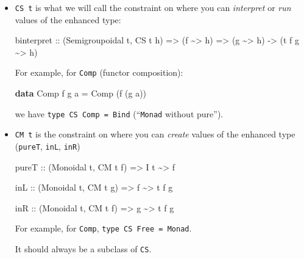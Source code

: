 \documentclass[]{article}
\newenvironment{Shaded}{}{}
\newcommand{\DataTypeTok}[1]{\textcolor[rgb]{0.56,0.13,0.00}{#1}}
\newcommand{\KeywordTok}[1]{\textcolor[rgb]{0.00,0.44,0.13}{\textbf{#1}}}
\newcommand{\NormalTok}[1]{#1}
\newcommand{\OperatorTok}[1]{\textcolor[rgb]{0.40,0.40,0.40}{#1}}
\newcommand{\OtherTok}[1]{\textcolor[rgb]{0.00,0.44,0.13}{#1}}
\begin{document}
\begin{itemize}
\item
  \texttt{CS\ t} is what we will call the constraint on where you can
  \emph{interpret} or \emph{run} values of the enhanced type:

\begin{Shaded}
\begin{Highlighting}[]
\NormalTok{binterpret}
\OtherTok{    ::}\NormalTok{ (}\DataTypeTok{Semigroupoidal}\NormalTok{ t, }\DataTypeTok{CS}\NormalTok{ t h)}
    \OtherTok{=>}\NormalTok{ (f }\OperatorTok{\textasciitilde{}>}\NormalTok{ h)}
    \OtherTok{=>}\NormalTok{ (g }\OperatorTok{\textasciitilde{}>}\NormalTok{ h)}
    \OtherTok{{-}>}\NormalTok{ (t f g }\OperatorTok{\textasciitilde{}>}\NormalTok{ h)}
\end{Highlighting}
\end{Shaded}

  For example, for \texttt{Comp} (functor composition):

\begin{Shaded}
\begin{Highlighting}[]
\KeywordTok{data} \DataTypeTok{Comp}\NormalTok{ f g a }\OtherTok{=} \DataTypeTok{Comp}\NormalTok{ (f (g a))}
\end{Highlighting}
\end{Shaded}

  we have \texttt{type\ CS\ Comp\ =\ Bind} (``\texttt{Monad} without pure'').
\item
  \texttt{CM\ t} is the constraint on where you can \emph{create} values of the
  enhanced type (\texttt{pureT}, \texttt{inL}, \texttt{inR})

\begin{Shaded}
\begin{Highlighting}[]
\NormalTok{pureT}
\OtherTok{    ::}\NormalTok{ (}\DataTypeTok{Monoidal}\NormalTok{ t, }\DataTypeTok{CM}\NormalTok{ t f)}
    \OtherTok{=>} \DataTypeTok{I}\NormalTok{ t }\OperatorTok{\textasciitilde{}>}\NormalTok{ f}

\OtherTok{inL ::}\NormalTok{ (}\DataTypeTok{Monoidal}\NormalTok{ t, }\DataTypeTok{CM}\NormalTok{ t g)}
    \OtherTok{=>}\NormalTok{ f }\OperatorTok{\textasciitilde{}>}\NormalTok{ t f g}

\OtherTok{inR ::}\NormalTok{ (}\DataTypeTok{Monoidal}\NormalTok{ t, }\DataTypeTok{CM}\NormalTok{ t f)}
    \OtherTok{=>}\NormalTok{ g }\OperatorTok{\textasciitilde{}>}\NormalTok{ t f g}
\end{Highlighting}
\end{Shaded}

  For example, for \texttt{Comp}, \texttt{type\ CS\ Free\ =\ Monad}.

  It should always be a subclass of \texttt{CS}.
\end{itemize}
\end{document}
